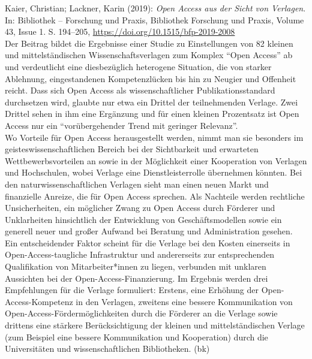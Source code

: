 \documentclass[a4paper,
fontsize=11pt,
oneside,
numbers=noperiodatend,
parskip=half-,
bibliography=totoc,
final
]{scrartcl}
\begin{document}
Kaier, Christian; Lackner, Karin (2019): \emph{Open Access aus der Sicht
von Verlagen}. In: Bibliothek -- Forschung und Praxis, Bibliothek
Forschung und Praxis, Volume 43, Issue 1. S. 194--205,
\url{https://doi.org/10.1515/bfp-2019-2008}\\
Der Beitrag bildet die Ergebnisse einer Studie zu Einstellungen von 82
kleinen und mittelständischen Wissenschaftsverlagen zum Komplex ``Open
Access'' ab und verdeutlicht eine diesbezüglich heterogene Situation,
die von starker Ablehnung, eingestandenen Kompetenzlücken bis hin zu
Neugier und Offenheit reicht. Dass sich Open Access als
wissenschaftlicher Publikationsstandard durchsetzen wird, glaubte nur
etwa ein Drittel der teilnehmenden Verlage. Zwei Drittel sehen in ihm
eine Ergänzung und für einen kleinen Prozentsatz ist Open Access nur ein
``vorübergehender Trend mit geringer Relevanz''.\\
Wo Vorteile für Open Access herausgestellt werden, nimmt man sie
besonders im geisteswissenschaftlichen Bereich bei der Sichtbarkeit und
erwarteten Wettbewerbsvorteilen an sowie in der Möglichkeit einer
Kooperation von Verlagen und Hochschulen, wobei Verlage eine
Dienstleisterrolle übernehmen könnten. Bei den naturwissenschaftlichen
Verlagen sieht man einen neuen Markt und finanzielle Anreize, die für
Open Access sprechen. Als Nachteile werden rechtliche Unsicherheiten,
ein möglicher Zwang zu Open Access durch Förderer und Unklarheiten
hinsichtlich der Entwicklung von Geschäftsmodellen sowie ein generell
neuer und großer Aufwand bei Beratung und Administration gesehen. Ein
entscheidender Faktor scheint für die Verlage bei den Kosten einerseits
in Open-Access-taugliche Infrastruktur und andererseits zur
entsprechenden Qualifikation von Mitarbeiter*innen zu liegen, verbunden
mit unklaren Aussichten bei der Open-Access-Finanzierung. Im Ergebnis
werden drei Empfehlungen für die Verlage formuliert: Erstens, eine
Erhöhung der Open-Access-Kompetenz in den Verlagen, zweitens eine
bessere Kommunikation von Open-Access-Fördermöglichkeiten durch die
Förderer an die Verlage sowie drittens eine stärkere Berücksichtigung
der kleinen und mittelständischen Verlage (zum Beispiel eine bessere
Kommunikation und Kooperation) durch die Universitäten und
wissenschaftlichen Bibliotheken. (bk)
\end{document}
